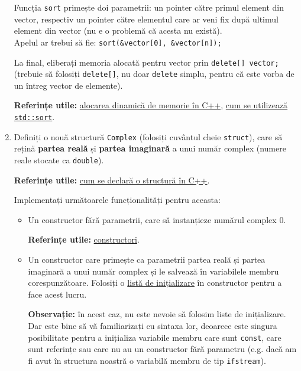 \begin{enumerate}
    Funcția \texttt{sort} primește doi parametrii: un pointer către primul element din vector, respectiv un pointer către elementul care ar veni fix după ultimul element din vector (nu e o problemă că acesta nu există). \\[0.5em]
    Apelul ar trebui să fie: \texttt{sort(\&vector[0], \&vector[n]);}

    La final, eliberați memoria alocată pentru vector prin \texttt{delete[] vector;} (trebuie să folosiți \texttt{delete[]}, nu doar \texttt{delete} simplu, pentru că este vorba de un întreg vector de elemente).

    \textbf{Referințe utile:} \href{https://cplusplus.com/doc/tutorial/dynamic/}{alocarea dinamică de memorie în C++}, \href{https://www.geeksforgeeks.org/sort-c-stl/}{cum se utilizează \texttt{std::sort}}.

    \item Definiți o nouă structură \texttt{Complex} (folosiți cuvântul cheie \texttt{struct}), care să rețină \textbf{partea reală} și \textbf{partea imaginară} a unui număr complex (numere reale stocate ca \texttt{double}).

    \textbf{Referințe utile:} \href{https://cplusplus.com/doc/tutorial/structures/}{cum se declară o structură în C++}.

    Implementați următoarele funcționalități pentru aceasta:
    \begin{itemize}
        \item Un constructor fără parametrii, care să instanțieze numărul complex \(0\).

        \textbf{Referințe utile:} \href{https://en.cppreference.com/w/cpp/language/constructor}{constructori}.

        \item Un constructor care primește ca parametrii partea reală și partea imaginară a unui număr complex și le salvează în variabilele membru corespunzătoare. Folosiți o \href{https://www.educative.io/answers/what-are-initializer-lists-in-cpp}{listă de inițializare} în constructor pentru a face acest lucru.

        \textbf{Observație:} în acest caz, nu este nevoie să folosim liste de inițializare. Dar este bine să vă familiarizați cu sintaxa lor, deoarece este singura posibilitate pentru a inițializa variabile membru care sunt \texttt{const}, care sunt referințe sau care nu au un constructor fără parametru (e.g. dacă am fi avut în structura noastră o variabilă membru de tip \texttt{ifstream}).


\end{itemize}
\end{enumerate}
